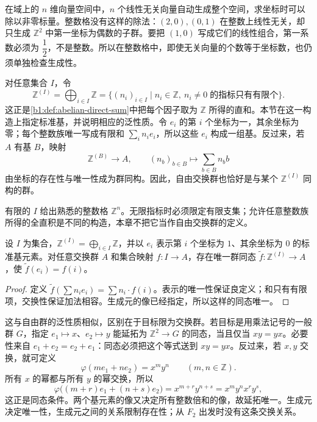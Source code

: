 \ProseParagraphBreak
在域上的 \(n\) 维向量空间中，\(n\) 个线性无关向量自动生成整个空间，求坐标时可以除以非零标量。整数格没有这样的除法：\((2,0),(0,1)\) 在整数上线性无关，却只生成 \(\mathbb Z^2\) 中第一坐标为偶数的子群。要把 \((1,0)\) 写成它们的线性组合，第一系数必须为 \(\dfrac12\)，不是整数。所以在整数格中，即使无关向量的个数等于坐标数，也仍须单独检查生成性。

\ProseParagraphBreak
对任意集合 \(I\)，令
\[
	\mathbb Z^{(I)} =\bigoplus_{i\in I}\mathbb Z
	=\bigl\{(n_i)_{i\in I}\mid n_i\in\mathbb Z,\ %
	n_i\ne0\;\text{的指标只有有限个}\bigr\}.
\]
这正是\cref{b1:def:abelian-direct-sum}中把每个因子取为 \(\mathbb Z\) 所得的直和。本节在这一构造上指定标准基，并说明相应的泛性质。令 \(e_i\) 的第 \(i\) 个坐标为一，其余坐标为零；每个整数族唯一写成有限和 \(\sum_i n_i e_i\)，所以这些 \(e_i\) 构成一组基。反过来，若 \(A\) 有基 \(B\)，映射
\[
	\mathbb Z^{(B)}\longrightarrow A,\qquad (n_b)_{b\in B}\longmapsto\sum_{b\in B}n_b b
\]
由坐标的存在性与唯一性成为群同构。因此，自由交换群也恰好是与某个 \(\mathbb Z^{(I)}\) 同构的群。

\ProseParagraphBreak
有限的 \(I\) 给出熟悉的整数格 \(\mathbb Z^n\)。无限指标时必须限定有限支集；允许任意整数族所得的全直积是不同的构造，本章不把它当作自由交换群的定义。

\begin{proposition}[自由交换群的泛性质]\label{b1:prop:free-abelian-universal}
	设 \(I\) 为集合，\(\mathbb Z^{(I)}=\bigoplus_{i\in I}\mathbb Z\)，并以 \(e_i\) 表示第 \(i\) 个坐标为 \(1\)、其余坐标为 \(0\) 的标准基元素。对任意交换群 \(A\) 和集合映射 \(f:I\to A\)，存在唯一群同态 \(\widetilde f:\mathbb Z^{(I)}\to A\)，使 \(\widetilde f(e_i)=f(i)\)。
\end{proposition}

\begin{proof}
	定义 \(\widetilde f(\sum n_i e_i)=\sum n_i\cdot f(i)\)。表示的唯一性保证良定义；和只有有限项，交换性保证加法相容。生成元的像已经指定，所以这样的同态唯一。
\end{proof}

这与自由群的泛性质相似，区别在于目标限为交换群。若目标是用乘法记号的一般群 \(G\)，指定 \(e_1\mapsto x\)、\(e_2\mapsto y\) 能延拓为 \(\mathbb Z^2\to G\) 的同态，当且仅当 \(xy=yx\)。必要性来自 \(e_1+e_2=e_2+e_1\)：同态必须把这个等式送到 \(xy=yx\)。反过来，若 \(x,y\) 交换，就可定义
\[
	\varphi(me_1+ne_2)=x^my^n\qquad(m,n\in\mathbb Z).
\]
所有 \(x\) 的幂都与所有 \(y\) 的幂交换，所以
\[
	\varphi\bigl((m+r)e_1+(n+s)e_2\bigr) =x^{m+r}y^{n+s}=x^my^n x^ry^s,
\]
这正是同态条件。两个基元素的像又决定所有整数倍和的像，故延拓唯一。生成元决定唯一性，生成元之间的关系限制存在性；从 \(F_2\) 出发时没有这条交换关系。

